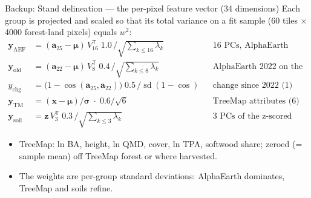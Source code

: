 \begin{frame}{Backup: Stand delineation — the per-pixel feature vector (34 dimensions)}
\footnotesize
Each group is projected and scaled so that its total variance on a fit sample (60 tiles $\times$ 4000 forest-land pixels) equals $w^2$:
\begin{align*}
\mathbf{y}_{\text{AEF}}  &= (\mathbf a_{25}-\boldsymbol\mu)\,V_{16}^{\mathsf{T}}\;1.0\,/\sqrt{\textstyle\sum_{k\le16}\lambda_k} &&\text{16 PCs, AlphaEarth 2025}\\
\mathbf{y}_{\text{old}}  &= (\mathbf a_{22}-\boldsymbol\mu)\,V_{8}^{\mathsf{T}}\;0.4\,/\sqrt{\textstyle\sum_{k\le8}\lambda_k} &&\text{AlphaEarth 2022 on the 2025 basis (8)}\\
y_{\text{chg}} &= \bigl(1-\cos(\mathbf a_{25},\mathbf a_{22})\bigr)\;0.5\,/\operatorname{sd}(1-\cos) &&\text{change since 2022 (1)}\\
\mathbf{y}_{\text{TM}} &= (\mathbf x-\boldsymbol\mu)/\boldsymbol\sigma\;\cdot\;0.6/\sqrt6 &&\text{TreeMap attributes (6)}\\
\mathbf{y}_{\text{soil}} &= \mathbf z\,V_{3}^{\mathsf{T}}\;0.3\,/\sqrt{\textstyle\sum_{k\le3}\lambda_k} &&\text{3 PCs of the z-scored soils}
\end{align*}
\begin{itemize}\setlength\itemsep{1pt}
\item TreeMap: ln BA, height, ln QMD, cover, ln TPA, softwood share; zeroed (= sample mean) off TreeMap forest or where harvested.
\item The weights are per-group standard deviations: AlphaEarth dominates, TreeMap and soils refine.
\end{itemize}
\end{frame}

